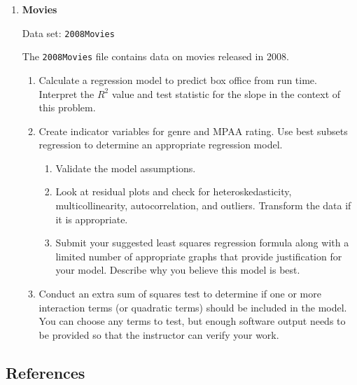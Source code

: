 \documentclass[
]{report}
\begin{document}
\begin{enumerate}
  \begin{enumerate}
    \item Use the \texttt{Caucuses} data to test the hypothesis that education level is correlated to a higher percentage of votes for Senator Obama.
      \item Use the \texttt{Caucuses} data to create a multivariate model that “best” predicts the percentage of delegates Senator Obama would win.
    \end{enumerate}

  \item \textbf{Movies}

Data set: \texttt{2008Movies}

The \texttt{2008Movies} file contains data on movies released in 2008.

  \begin{enumerate}
    \item Calculate a regression model to predict box office from run time. Interpret the $\scriptstyle {R}^2$ value and test statistic for the slope in the context of this problem.
      \item Create indicator variables for genre and MPAA rating. Use best subsets regression to determine an appropriate regression model.
        \begin{enumerate}
          \item Validate the model assumptions.
          \item Look at residual plots and check for heteroskedasticity, multicollinearity, autocorrelation, and outliers. Transform the data if it is appropriate.
          \item Submit your suggested least squares regression formula along with a limited number of appropriate graphs that provide justification for your model. Describe why you believe this model is best.
        \end{enumerate}
      \item Conduct an extra sum of squares test to determine if one or more interaction terms (or quadratic terms) should be included in the model. You can choose any terms to test, but enough software output needs to be provided so that the instructor can verify your work.
    \end{enumerate}

\end{enumerate}

\hypertarget{references-2}{%
\subsection*{References}\label{references-2}}
\end{document}
